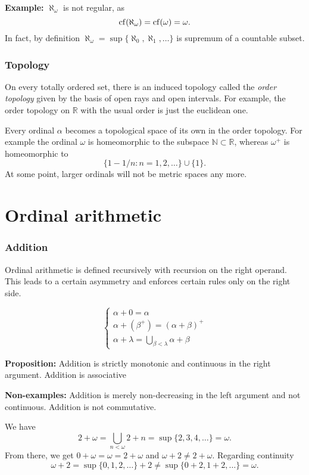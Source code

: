 \textbf{Example: } $\aleph_\omega$ is not regular, as 
\[ \mathrm{cf}(\aleph_\omega) = \mathrm{cf}(\omega) = \omega. \] 
In fact, by definition $\aleph_\omega = \sup \{ \aleph_0, \aleph_1, \ldots \}$ is supremum of a countable subset. 

\section{Topology}
On every totally ordered set, there is an induced topology called the \emph{order topology} given by the basis of open rays and open intervals. For example, the order topology on $\mathbb R$ with the usual order is just the euclidean one.

Every ordinal $\alpha$ becomes a topological space of its own in the order topology. For example the ordinal $\omega$ is homeomorphic to the subspace $\mathbb N \subset \mathbb R$, whereas $\omega^+$ is homeomorphic to
\[ \{ 1 - 1/n : n = 1,2, \ldots\} \cup \{ 1 \}. \]
At some point, larger ordinals will not be metric spaces any more. \\


\pagebreak 

\part{Ordinal arithmetic}
\section{Addition}
Ordinal arithmetic is defined recursively with recursion on the right operand. This leads to a certain asymmetry and enforces certain rules only on the right side.

\[ 
\begin{cases}
	\alpha + 0 = \alpha \\
	\alpha + (\beta^+) = (\alpha + \beta)^+ \\
	\alpha + \lambda = \bigcup_{\beta < \lambda} \alpha + \beta
\end{cases}
\]

\textbf{Proposition: } Addition is strictly monotonic and continuous in the right argument. Addition is associative

\textbf{Non-examples: } Addition is merely non-decreasing in the left argument and not continuous. Addition is not commutative.

We have 
\[ 2 + \omega = \bigcup_{n < \omega} 2 + n = \sup \{ 2, 3, 4, \ldots \} = \omega. \]
From there, we get $0 + \omega = \omega = 2 + \omega$ and $\omega + 2 \neq 2 + \omega$. Regarding continuity
\[ \omega + 2 = \sup \{0,1,2,\ldots\} + 2 \neq \sup \{0 + 2, 1 + 2, \ldots\} = \omega. \]

